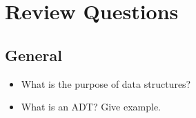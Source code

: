 \chapter{Review Questions}

\section{General}
\begin{itemize}
	\item What is the purpose of data structures?
	\item What is an \ac{ADT}? Give example.
\end{itemize}